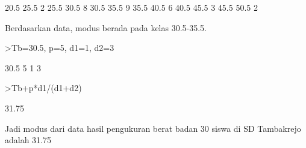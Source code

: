 \documentclass[a4paper,10pt]{article}
\begin{document}
\begin{eulernotebook}
\begin{euleroutput}
        20.5      25.5         2
        25.5      30.5         8
        30.5      35.5         9
        35.5      40.5         6
        40.5      45.5         3
        45.5      50.5         2
\end{euleroutput}
\begin{eulercomment}
Berdasarkan data, modus berada pada kelas 30.5-35.5.
\end{eulercomment}
\begin{eulerprompt}
>Tb=30.5, p=5, d1=1, d2=3
\end{eulerprompt}
\begin{euleroutput}
  30.5
  5
  1
  3
\end{euleroutput}
\begin{eulerprompt}
>Tb+p*d1/(d1+d2)
\end{eulerprompt}
\begin{euleroutput}
  31.75
\end{euleroutput}
\begin{eulercomment}
Jadi modus dari data hasil pengukuran berat badan 30 siswa di SD
Tambakrejo adalah 31.75
\end{eulercomment}
\end{eulernotebook}
\end{document}

